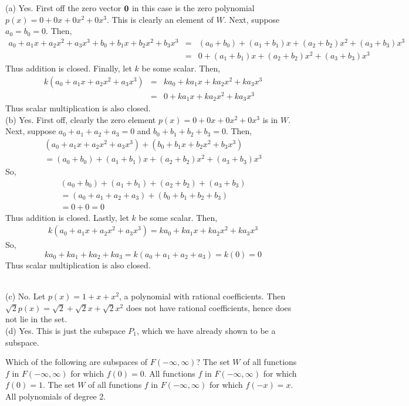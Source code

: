 \ee
\begin{solution}
\noindent (a) 
Yes. 
\bb[(i)]
\ii First off the zero vector ${\mathbf 0}$ in this case is the zero polynomial $p(x)=0+0x+0x^2+0x^3$. This is clearly an element of $W$.
\ii Next, suppose $a_0 = b_0 = 0$. Then,
\begin{eqnarray*}
a_0+a_1x+a_2x^2+a_3x^3 + b_0+b_1x+b_2x^2+b_3x^3 &=& (a_0+b_0) + (a_1 +b_1)x + (a_2 +b_2)x^2 + (a_3 + b_3)x^3\\
&=& 0 + (a_1 +b_1)x + (a_2 +b_2)x^2 + (a_3 + b_3)x^3
\end{eqnarray*}
Thus addition is closed. 
\ii Finally, let $k$ be some scalar. Then,
\begin{eqnarray*}
k(a_0+a_1x+a_2x^2+a_3x^3) &=& ka_0+ka_1x+ka_2x^2+ka_3x^3\\
&=& 0 + ka_1x+ka_2x^2+ka_3x^3
\end{eqnarray*}
Thus scalar multiplication is also closed.
\ee
\ \\
(b) Yes. 
\bb[(i)]
\ii First off, clearly the zero element $p(x)=0+0x+0x^2+0x^3$ is in $W$. 
\ii Next, suppose $a_0 + a_1 + a_2 + a_3 = 0$ and $b_0 + b_1 + b_2 + b_3 = 0$. Then,
\begin{eqnarray*}
(a_0 + a_1x + a_2x^2 + a_3x^3) + (b_0 + b_1x + b_2x^2 + b_3x^3)\\ = (a_0+b_0) + (a_1+b_1)x + (a_2+b_2)x^2+(a_3+b_3)x^3
\end{eqnarray*}
So,
\begin{eqnarray*}
(a_0+b_0) + (a_1+b_1) + (a_2+b_2) + (a_3+b_3)\\
= (a_0 + a_1 + a_2 + a_3) + (b_0 + b_1 + b_2 + b_3)\\
=0 + 0 = 0
\end{eqnarray*}
Thus addition is closed. 
\ii Lastly, let $k$ be some scalar. Then,
\begin{eqnarray*}
k(a_0+a_1x+a_2x^2+a_3x^3) = ka_0+ka_1x+ka_2x^2+ka_3x^3
\end{eqnarray*}
So,
$$
ka_0+ka_1+ka_2+ka_3 = k(a_0 + a_1 + a_2 + a_3) = k(0)=0
$$
Thus scalar multiplication is also closed.
\ee

\ \\ (c) No.  Let $p(x)=1+x+x^2$, a polynomial with rational coefficients. Then $\sqrt{2}p(x)=\sqrt{2}+\sqrt{2}x+\sqrt{2}x^2$ does not have rational coefficients, hence does not lie in the set. 
\ \\
(d) Yes. This is just the subspace $P_1$, which we have already shown to be a subspace. 
\end{solution}
\ii Which of the following are subspaces of $F(-\infty,\infty)$?
\bb
\ii The set $W$ of all functions $f$ in $F(-\infty,\infty)$ for which $f(0) = 0$.
\ii All functions $f$ in $F(-\infty,\infty)$ for which $f(0) = 1$.
\ii The set $W$ of all functions $f$ in $F(-\infty,\infty)$ for which $f(-x) = x$.
\ii All polynomials of degree 2.

